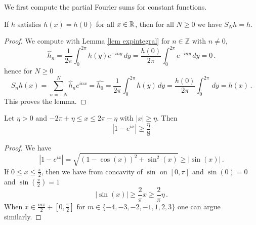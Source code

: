{We first compute the partial Fourier sums for constant functions.


\begin{lemma}\label{constant}
If $h$ satisfies $h(x)=h(0)$ for all $x\in \mathbb{R}$, then for all $N\ge 0$ we have $S_Nh=h$.
 \end{lemma}
\begin{proof}
    We compute with Lemma \ref{lem expintegral} for $n\in \mathbb{Z}$ with $n\neq 0$,
    \begin{equation}
        \widehat{h}_n=\frac 1{2\pi}\int_0^{2\pi}h(y)e^{-iny}\, dy=\frac {h(0)}{2\pi}\int_0^{2\pi}e^{-iny}\, dy=0\, .
    \end{equation}
hence for $N\ge 0$
\begin{equation}
    S_nh(x)=\sum_{n=-N}^N \widehat{h}_n e^{inx}=\widehat{h_0}=\frac{1}{2\pi}\int_0^{2\pi}h(y)\, dy
    =\frac{h(0)}{2\pi}\int_0^{2\pi}\, dy=h(x)\, .
\end{equation}
This proves the lemma.
\end{proof}
\begin{lemma}\label{expbound}
Let $\eta>0$ and $-2\pi +\eta \le  x\le 2\pi-\eta$ with $|x|\ge \eta$. Then
\begin{equation}
    |1-e^{ix}|\ge \frac {\eta} 8
\end{equation}
\end{lemma}
\begin{proof}
 
We have
$$
    |1 - e^{ix}| = \sqrt{(1 - \cos(x))^2 + \sin^2(x)} \ge |\sin(x)|\,.
$$
If $0 \le x \le \frac{\pi}{2}$, then we have from concavity of $\sin$ on $[0, \pi]$ and $\sin(0) = 0$ and $\sin(\frac{\pi}{2}) = 1$
$$
    |\sin(x)| \ge \frac{2}{\pi} x \ge \frac{2}{\pi} \eta\,.
$$
When $x\in \frac{m\pi}{2} + [0, \frac{\pi}{2}]$ for $m \in \{-4, -3, -2, -1, 1, 2, 3\}$ one can argue similarly.
 \end{proof}

}
